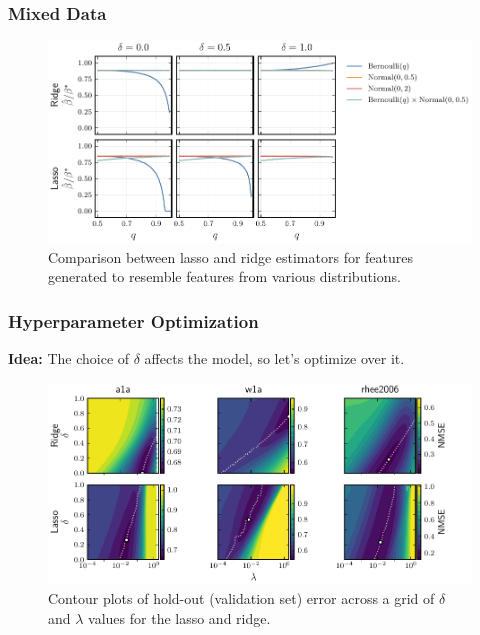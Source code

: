\documentclass[10pt]{beamer}
\begin{document}
\begin{frame}[c]
  \frametitle{Mixed Data}

  \begin{figure}[htpb]
    \centering
    \includegraphics[width=\textwidth]{figures/mixed_data.pdf}
    \caption{%
      Comparison between lasso and ridge estimators for features generated to resemble features from various distributions.}
  \end{figure}
\end{frame}

\begin{frame}[c]
  \frametitle{Hyperparameter Optimization}

  \textbf{Idea:} The choice of \(\delta\) affects the model, so let's optimize over it.

  \begin{figure}[htpb]
    \centering
    \includegraphics[width=\textwidth]{figures/hyperopt_surfaces.pdf}
    \caption{%
      Contour plots of hold-out (validation set) error across a grid of \(\delta\) and \(\lambda\) values for the
      lasso and ridge.
    }
  \end{figure}

\end{frame}
\end{document}
